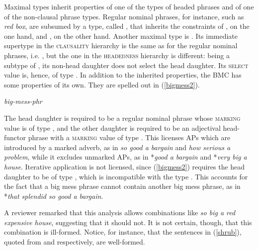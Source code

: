 \documentclass[output=paper
	        ,collection
	        ,collectionchapter
 	        ,biblatex
                ,babelshorthands
                ,newtxmath
                ,draftmode
                ,colorlinks, citecolor=brown
]{langscibook}
\begin{document}
Maximal types inherit properties of one of the types of headed phrases
and of one of the non-clausal phrase types.  
Regular nominal phrases, for instance, such as \emph{red box}, are subsumed 
by a type, called , that inherits the 
constraints of , on the one hand, and 
, on the other hand.  
Another maximal type is . 
Its immediate supertype in the \textsc{clausality} hierarchy is the same 
as for the regular nominal phrases, i.e. , 
but the one in the \textsc{headedness} hierarchy is different: 
being a subtype of , 
its non-head daughter does not select the head daughter. Its \textsc{select} 
value is, hence, of type . 
In addition to the inherited properties, the BMC has some properties of its own.   
They are spelled out in (\ref{bigmess2}).

\begin{exe}
\ex\label{bigmess2} 
\emph{big-mess-phr} \impl \\
\end{exe}

\noindent
The head daughter is required to be a regular nominal phrase 
whose \textsc{marking} value is of type , and the other daughter 
is required to be an adjectival head-functor phrase
with a \textsc{marking} value of type . 
This licenses APs which are introduced by a marked adverb, 
as in \emph{so good a bargain} and \emph{how serious a problem}, 
while it excludes unmarked APs, as in 
*\emph{good a bargain} and *\emph{very big a house}.
Iterative application is not licensed, since (\ref{bigmess2}) requires the 
head daughter to be of type , which is incompatible with the type 
. This accounts for the fact that a big
mess phrase cannot contain another big mess phrase, as in
*\emph{that splendid so good a bargain}.

A reviewer remarked that this analysis allows combinations like 
\emph{so big a red expensive house}, suggesting that it should not. 
It is not certain, though, that this combination is ill-formed.
Notice, for instance, that the sentences in (\ref{shrub}), 
quoted from \citet[116]{Zwicky95} and \citet[42]{Troseth09} respectively, 
are well-formed. 
\end{document}
